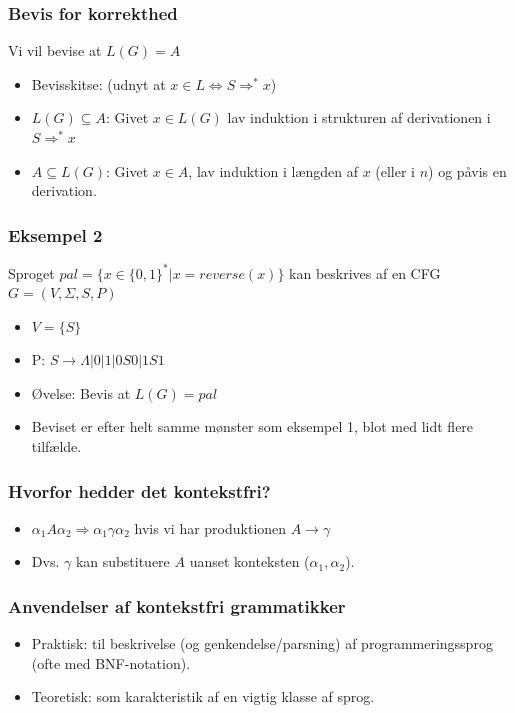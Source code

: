 \documentclass{beamer}
\begin{document}
\begin{frame}
\frametitle{Bevis for korrekthed}
Vi vil bevise at $L(G)=A$
\begin{itemize}[<+->]
\item Bevisskitse: (udnyt at $x\in L \Leftrightarrow S \Rightarrow^* x$)
\item $L(G) \subseteq A$: Givet $x\in L(G)$ lav induktion i strukturen af derivationen i $S \Rightarrow^* x$
\item $A \subseteq L(G)$: Givet $x\in A$, lav induktion i længden af $x$ (eller i $n$) og påvis en derivation.
\end{itemize}
\end{frame}

\begin{frame}
\frametitle{Eksempel 2}
Sproget $pal=\{x\in \{0,1\}^* | x = reverse(x)\}$ kan beskrives af en CFG $G = (V, \Sigma, S, P)$
\begin{itemize}[<+->]
\item $V=\{S\}$
\item P: $S\rightarrow \Lambda | 0 | 1 | 0S0 | 1S1$
\item Øvelse: Bevis at $L(G) = pal$
\item Beviset er efter helt samme mønster som eksempel 1, blot med lidt flere tilfælde.
\end{itemize}
\end{frame}


\begin{frame}
\frametitle{Hvorfor hedder det kontekstfri?}
\begin{itemize}[<+->]
\item $\alpha_1A\alpha_2 \Rightarrow \alpha_1\gamma\alpha_2$ hvis vi har produktionen $A\rightarrow \gamma$
\item Dvs. $\gamma$ kan substituere $A$ uanset konteksten ($\alpha_1, \alpha_2$).
\end{itemize}
\end{frame}

\begin{frame}
\frametitle{Anvendelser af kontekstfri grammatikker}
\begin{itemize}[<+->]
\item Praktisk: til beskrivelse (og genkendelse/parsning) af
  programmeringssprog (ofte med BNF-notation).
\item Teoretisk: som karakteristik af en vigtig klasse af sprog.
\end{itemize}
\end{frame}
\end{document}
